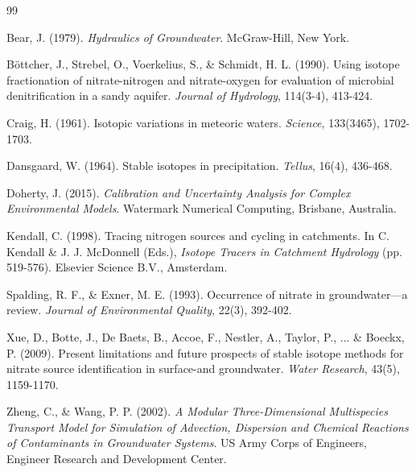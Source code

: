 \documentclass[12pt,a4paper]{article}
\begin{document}

\begin{thebibliography}{99}

Bear, J. (1979). \textit{Hydraulics of Groundwater}. McGraw-Hill, New York.

Böttcher, J., Strebel, O., Voerkelius, S., \& Schmidt, H. L. (1990). Using isotope fractionation of nitrate-nitrogen and nitrate-oxygen for evaluation of microbial denitrification in a sandy aquifer. \textit{Journal of Hydrology}, 114(3-4), 413-424.

Craig, H. (1961). Isotopic variations in meteoric waters. \textit{Science}, 133(3465), 1702-1703.

Dansgaard, W. (1964). Stable isotopes in precipitation. \textit{Tellus}, 16(4), 436-468.

Doherty, J. (2015). \textit{Calibration and Uncertainty Analysis for Complex Environmental Models}. Watermark Numerical Computing, Brisbane, Australia.

Kendall, C. (1998). Tracing nitrogen sources and cycling in catchments. In C. Kendall \& J. J. McDonnell (Eds.), \textit{Isotope Tracers in Catchment Hydrology} (pp. 519-576). Elsevier Science B.V., Amsterdam.

Spalding, R. F., \& Exner, M. E. (1993). Occurrence of nitrate in groundwater—a review. \textit{Journal of Environmental Quality}, 22(3), 392-402.

Xue, D., Botte, J., De Baets, B., Accoe, F., Nestler, A., Taylor, P., ... \& Boeckx, P. (2009). Present limitations and future prospects of stable isotope methods for nitrate source identification in surface-and groundwater. \textit{Water Research}, 43(5), 1159-1170.

Zheng, C., \& Wang, P. P. (2002). \textit{A Modular Three-Dimensional Multispecies Transport Model for Simulation of Advection, Dispersion and Chemical Reactions of Contaminants in Groundwater Systems}. US Army Corps of Engineers, Engineer Research and Development Center.

\end{thebibliography}
\end{document}
